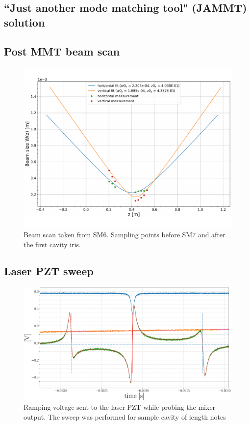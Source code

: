 \subsection{``Just another mode matching tool" (JAMMT) solution}
\subsection{Post MMT beam scan}

\begin{figure}[H]
\includegraphics[width=\textwidth]{figs/ALGAAS/beam_scans/01_12_2021_postMMT.pdf}
\caption{Beam scan taken from SM6. Sampling points before SM7 and after the first cavity iris.}
\label{fig:beamscan2021}
\end{figure}

\subsection{Laser PZT sweep}

\begin{figure}[H]
	\includegraphics[width=\textwidth]{figs/ALGAAS/pdh_measured.pdf}
	\caption{Ramping voltage sent to the laser PZT while probing the mixer output. The sweep was performed for sample cavity of length notes}
\label{fig:pdhmeasured}
\end{figure}

